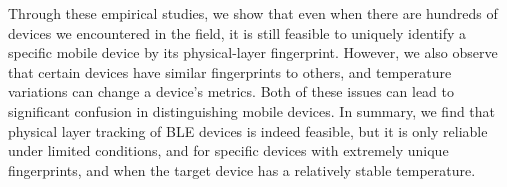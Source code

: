 Through these empirical studies, we show that even when there are hundreds of devices we encountered in the field, it is still feasible to uniquely identify 
a specific mobile device by its physical-layer fingerprint. 
%
However, we also
observe that certain devices have similar fingerprints to others, and temperature
variations can change a device's metrics. 
%
Both of these issues can lead to significant confusion in distinguishing mobile devices.
%
In summary, we find that physical layer tracking of
BLE devices is indeed feasible, but it is only
reliable under limited conditions, and for specific devices with extremely
unique fingerprints, and when the target device has a relatively stable
temperature. 

